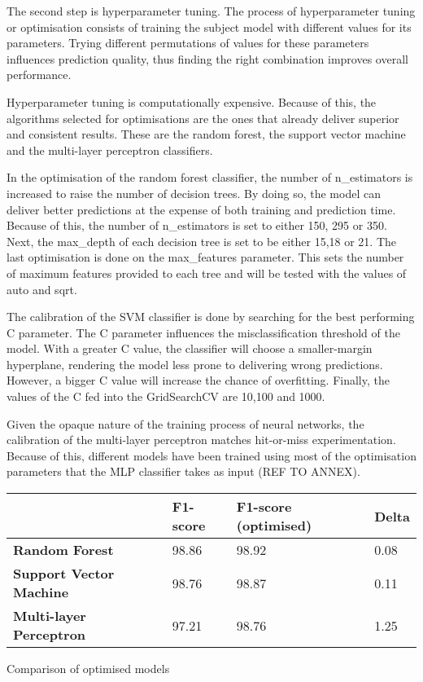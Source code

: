 The second step is hyperparameter tuning. The process of hyperparameter tuning or optimisation consists of training the subject model with different values for its parameters. Trying different permutations of values for these parameters influences prediction quality, thus finding the right combination improves overall performance.

Hyperparameter tuning is computationally expensive. Because of this, the algorithms selected for optimisations are the ones that already deliver superior and consistent results. These are the random forest, the support vector machine and the multi-layer perceptron classifiers.

In the optimisation of the random forest classifier, the number of n\_estimators is increased to raise the number of decision trees. By doing so, the model can deliver better predictions at the expense of both training and prediction time. Because of this, the number of n\_estimators is set to either 150, 295 or 350. Next, the max\_depth of each decision tree is set to be either 15,18 or 21. The last optimisation is done on the max\_features parameter. This sets the number of maximum features provided to each tree and will be tested with the values of auto and sqrt.

The calibration of the SVM classifier is done by searching for the best performing C parameter. The C parameter influences the misclassification threshold of the model. With a greater C value, the classifier will choose a smaller-margin hyperplane, rendering the model less prone to delivering wrong predictions. However, a bigger C value will increase the chance of overfitting. Finally, the values of the C fed into the GridSearchCV are 10,100 and 1000.

Given the opaque nature of the training process of neural networks, the calibration of the multi-layer perceptron matches hit-or-miss experimentation. Because of this, different models have been trained using most of the optimisation parameters that the MLP classifier takes as input (REF TO ANNEX).

\begin{singlespace}
	\begin{center}
		\label{tab:OPTIMISED_MODELS}
		\begin{tabular}{ | m{13em} | m{5em} | m{10em} | m{2.3em} |}
			\hline
			                                & \textbf{F1-score} & \textbf{F1-score (optimised)} & \textbf{Delta} \\
			\hline
			\textbf{Random Forest}          & 98.86             & 98.92                         & 0.08           \\
			\hline
			\textbf{Support Vector Machine} & 98.76             & 98.87                         & 0.11           \\
			\hline
			\textbf{Multi-layer Perceptron} & 97.21             & 98.76                         & 1.25           \\
			\hline
		\end{tabular}
		\captionsetup{type=table}\caption{Comparison of optimised models}
	\end{center}
\end{singlespace}


